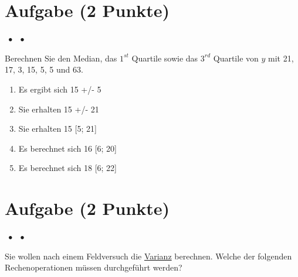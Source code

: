 \documentclass[a4paper, 9pt]{scrartcl}\usepackage[]{graphicx}\usepackage[]{xcolor}
\begin{document}
\section{Aufgabe \hfill (2 Punkte)}

\ifcollection
\begin{flushright}
\tiny\vspace{-2Ex}
\textbf{\examinhaltstart}
\exammodulemathstat $\;\bullet$
\exammodulestat $\;\bullet$
\exammodulestatbbv 
\vspace{-1Ex}
\end{flushright}
\fi




Berechnen Sie den Median, das $1^{st}$ Quartile sowie das $3^{rd}$ Quartile von $y$ mit 21, 17, 3, 15, 5, 5 und 63.




\begin{enumerate}
\item [\textbf{A} \msquare] Es ergibt sich 15 +/- 5
\item [\textbf{B} \msquare] Sie erhalten 15 +/- 21
\item [\textbf{C} \msquare] Sie erhalten 15 [5; 21]
\item [\textbf{D} \msquare] Es berechnet sich 16 [6; 20]
\item [\textbf{E} \msquare] Es berechnet sich 18 [6; 22]
\end{enumerate} 

\section{Aufgabe \hfill (2 Punkte)}

\ifcollection
\begin{flushright}
\tiny\vspace{-2Ex}
\textbf{\examinhaltstart}
\exammodulemathstat $\;\bullet$
\exammodulestat $\;\bullet$
\exammodulestatbbv 
\vspace{-1Ex}
\end{flushright}
\fi




Sie wollen nach einem Feldversuch die \uline{Varianz} berechnen. Welche der folgenden Rechenoperationen müssen durchgeführt werden?
\end{document}
